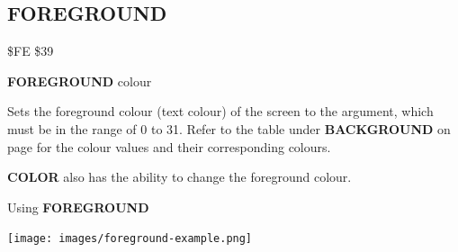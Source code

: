 \newpage
\label{foregroundcommand}
\subsection{FOREGROUND}
\begin{description}[leftmargin=2cm,style=nextline]
\item [Token:] \$FE \$39
\item [Format:] {\bf FOREGROUND} colour
\item [Usage:] Sets the foreground colour
               (text colour) of the screen to the argument,
               which must be in the
               range of 0 to 31.
               Refer to the table under
               {\bf BACKGROUND} on page \pageref{colourtable}
               for the colour values and their corresponding colours.
\item [Remarks:] {\bf COLOR} also has the ability to change the foreground colour.

\item [Example:] Using {\bf FOREGROUND}
\item \begin{center}\texttt{[image: images/foreground-example.png]}\end{center}
\end{description}


\newpage
